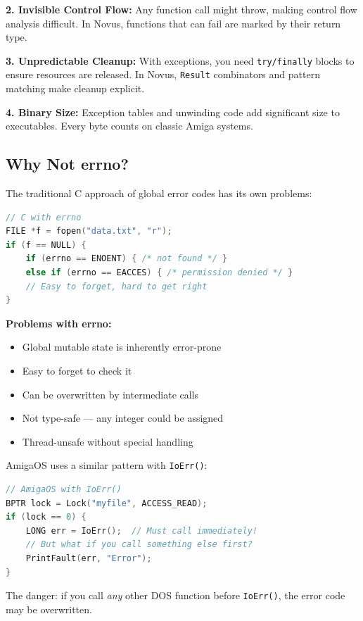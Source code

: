 \textbf{2. Invisible Control Flow:}
Any function call might throw, making control flow analysis difficult. In Novus, functions that can fail are marked by their return type.

\textbf{3. Unpredictable Cleanup:}
With exceptions, you need \texttt{try/finally} blocks to ensure resources are released. In Novus, \texttt{Result} combinators and pattern matching make cleanup explicit.

\textbf{4. Binary Size:}
Exception tables and unwinding code add significant size to executables. Every byte counts on classic Amiga systems.

\subsection{Why Not errno?}

The traditional C approach of global error codes has its own problems:

\begin{lstlisting}[language=C]
// C with errno
FILE *f = fopen("data.txt", "r");
if (f == NULL) {
    if (errno == ENOENT) { /* not found */ }
    else if (errno == EACCES) { /* permission denied */ }
    // Easy to forget, hard to get right
}
\end{lstlisting}

\textbf{Problems with errno:}
\begin{itemize}
    \item Global mutable state is inherently error-prone
    \item Easy to forget to check it
    \item Can be overwritten by intermediate calls
    \item Not type-safe --- any integer could be assigned
    \item Thread-unsafe without special handling
\end{itemize}

AmigaOS uses a similar pattern with \texttt{IoErr()}:

\begin{lstlisting}[language=C]
// AmigaOS with IoErr()
BPTR lock = Lock("myfile", ACCESS_READ);
if (lock == 0) {
    LONG err = IoErr();  // Must call immediately!
    // But what if you call something else first?
    PrintFault(err, "Error");
}
\end{lstlisting}

The danger: if you call \emph{any} other DOS function before \texttt{IoErr()}, the error code may be overwritten.

